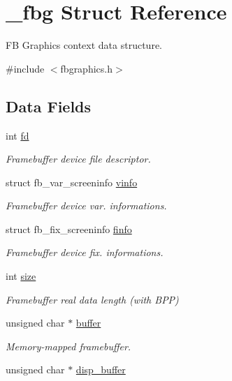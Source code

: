 \hypertarget{struct__fbg}{}\section{\+\_\+fbg Struct Reference}
\label{struct__fbg}


FB Graphics context data structure.  




{\ttfamily \#include $<$fbgraphics.\+h$>$}

\subsection*{Data Fields}
\begin{DoxyCompactItemize}
\item 
int \mbox{\hyperlink{struct__fbg_acfa58132f44f89e832ae7f73f5583b7e}{fd}}
\begin{DoxyCompactList}\small\item\em Framebuffer device file descriptor. \end{DoxyCompactList}\item 
struct fb\+\_\+var\+\_\+screeninfo \mbox{\hyperlink{struct__fbg_a22447f0d56680de6ff37587b44f7cf4b}{vinfo}}
\begin{DoxyCompactList}\small\item\em Framebuffer device var. informations. \end{DoxyCompactList}\item 
struct fb\+\_\+fix\+\_\+screeninfo \mbox{\hyperlink{struct__fbg_a954dd14a4129eed7ebe09f31bd025861}{finfo}}
\begin{DoxyCompactList}\small\item\em Framebuffer device fix. informations. \end{DoxyCompactList}\item 
int \mbox{\hyperlink{struct__fbg_a84fb220d4804cba22176997898e75b73}{size}}
\begin{DoxyCompactList}\small\item\em Framebuffer real data length (with B\+PP) \end{DoxyCompactList}\item 
unsigned char $\ast$ \mbox{\hyperlink{struct__fbg_abd19f36337c99f866e03eb88f6c2a9d5}{buffer}}
\begin{DoxyCompactList}\small\item\em Memory-\/mapped framebuffer. \end{DoxyCompactList}\item 
unsigned char $\ast$ \mbox{\hyperlink{struct__fbg_aa20614c94c7235bc5bc105b6e71e1be8}{disp\+\_\+buffer}}

\end{DoxyCompactItemize}
